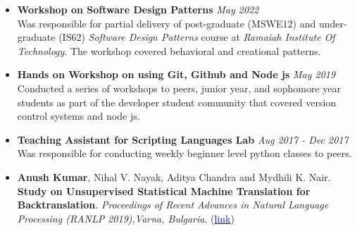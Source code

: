 \documentclass[11pt,a4paper]{article}
\begin{document}
{
\colorbox{gray}{}
\begin{itemize}
    \item \textbf{Workshop on Software Design Patterns} \hfill \textit{May 2022}
    \\Was responsible for partial delivery of post-graduate (MSWE12) and under-graduate (IS62) \textit{Software Design Patterns} course at \textit{Ramaiah Institute Of Technology}. The workshop covered behavioral and creational patterns.
\end{itemize}
\begin{itemize}
    \item \textbf{Hands on Workshop on using  Git, Github and Node js} \hfill \textit{May 2019}
    \\Conducted a series of workshops to peers, junior year, and sophomore year students as part of the developer student community that covered version control systems and node js.
\end{itemize}
\begin{itemize}
    \item \textbf{Teaching Assistant for Scripting Languages Lab} \hfill \textit{Aug 2017 - Dec 2017}
    \\Was responsible for conducting weekly beginner level python classes to peers. 
\end{itemize}
}
{
\colorbox{gray}{}
\begin{itemize}
    \item \textbf{Anush Kumar}, Nihal V. Nayak, Aditya Chandra and Mydhili K. Nair. \textbf{Study on Unsupervised Statistical Machine Translation for Backtranslation}. \textit{Proceedings of Recent Advances in Natural Language Processing (RANLP 2019),Varna, Bulgaria}. (\href{https://aclanthology.org/R19-1068/}{\textcolor{blue}{link}}) 
\end{itemize}
}
\end{document}
